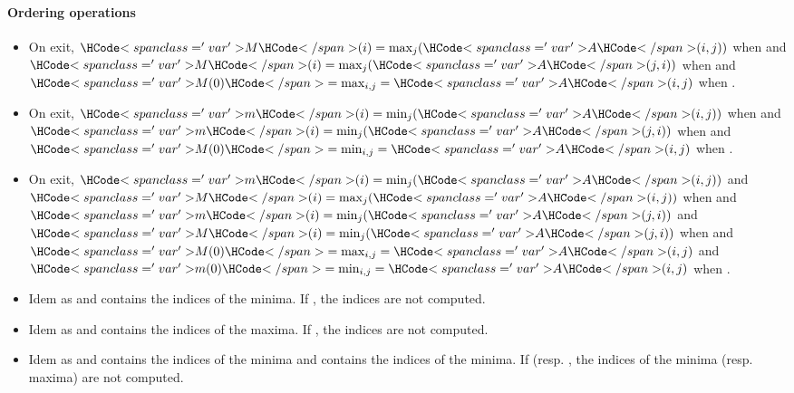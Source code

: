 \paragraph{Ordering operations}

\begin{itemize}
\item {}
  \sshortdescribe On exit, $\var{M}(i) = \max_{j}(\var{A}(i, j))$ when 
  and $\var{M}(i) = \max_{j}(\var{A}(j, i))$ when  and $\var{M(0)} =
  \max_{i,j} = \var{A}(i, j)$ when .

\item {}
  \sshortdescribe On exit, $\var{m}(i) = \min_{j}(\var{A}(i, j))$ when 
  and $\var{m}(i) = \min_{j}(\var{A}(j, i))$ when  and $\var{M(0)} =
  \min_{i,j} = \var{A}(i, j)$ when .

\item {}
  \sshortdescribe On exit, $\var{m}(i) = \min_{j}(\var{A}(i, j))$ and $\var{M}(i) =
  \max_{j}(\var{A}(i, j))$ when  and $\var{m}(i) = \min_{j}(\var{A}(j, i))$
  and $\var{M}(i) = \min_{j}(\var{A}(j, i))$ when  and $\var{M(0)} =
  \max_{i,j} = \var{A}(i, j)$ and  $\var{m(0)} =\min_{i,j} = \var{A}(i, j)$ when .
  
\item {}
  \sshortdescribe Idem as  and  contains the
  indices of the minima. If , the indices are not computed.

\item {}
  \sshortdescribe Idem as  and  contains the
  indices of the maxima. If , the indices are not computed.

\item {}
  \sshortdescribe Idem as  and  contains the
  indices of the minima and  contains the indices of the minima. If
   (resp. , the indices of the minima
  (resp. maxima) are not computed.


\end{itemize}

